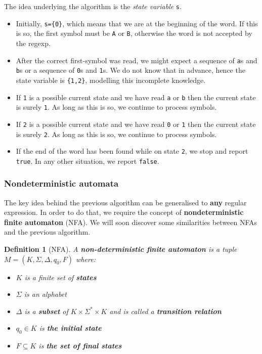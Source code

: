\documentclass[a4paper, 12pt]{article}
\newtheorem*{theorem}{Definition}
\begin{document}
The idea underlying the algorithm is the \textit{state variable} \texttt{s}. 
  \begin{itemize}
  	\item  Initially, \texttt{s=\{0\}}, which means that we are at the beginning of the word. If this is so, the first symbol must be \texttt{A} or \texttt{B}, otherwise the word is not accepted by the regexp. 
  	\item  After the correct first-symbol was read, we might expect a sequence of \texttt{a}s and \texttt{b}s or a sequence of \texttt{0}s and \texttt{1}s. We do not know that in advance, hence the state variable is \texttt{\{1,2\}}, modelling this incomplete knowledge.
  	\item  If \texttt{1} is a possible current state and we have read \texttt{a} or \texttt{b} then the current state is surely \texttt{1}. As long as this is so, we continue to process symbols.
  	\item  If \texttt{2} is a possible current state and we have read \texttt{0} or \texttt{1} then the current state is surely \texttt{2}. As long as this is so, we continue to process symbols.
  	\item  If the end of the word has been found while on state \texttt{2}, we stop and report \texttt{true}. In any other situation, we report \texttt{false}.
  \end{itemize}

\subsubsection{ Nondeterministic automata }

The key idea behind the previous algorithm can be generalised to \textbf{any} regular expression. In order to do that, we require the concept of \textbf{nondeterministic finite automaton} (NFA). We will soon discover some similarities between NFAs and the previous algorithm.

\begin{theorem}[NFA]

A \textbf{non-deterministic finite automaton} is a tuple $M=(K,\Sigma,\Delta,q_0,F)$ where:
  \begin{itemize}
  	\item  $K$ is a finite set of \textbf{states}
  	\item  $\Sigma$ is an alphabet
  	\item  $\Delta$ is a \textbf{subset} of $K \times \Sigma^* \times K$ and is called a \textbf{transition relation}
  	\item  $q_0\in K$ is \textbf{the initial state}
  	\item  $F\subseteq K$ is \textbf{the set of final states}
  \end{itemize}

\end{theorem}
\end{document}
